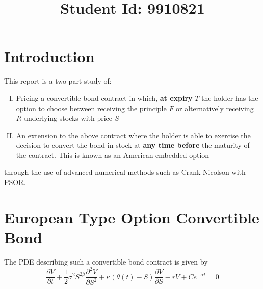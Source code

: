 \documentclass{article}
\begin{document}
\title{Student Id: 9910821}
\date{}

\maketitle
\section*{Introduction}
This report is a two part study of:
\begin{enumerate}[I)]
  \item Pricing a convertible bond contract in  which, \textbf{at expiry} $T$ the  holder  has  the option to  choose  between  receiving the principle $F$ or alternatively receiving $R$ underlying stocks with price $S$
  \item An extension to the above contract where the holder is able to exercise the decision to convert the bond in stock at \textbf{any time before} the maturity of the contract. This is known as an American embedded option
\end{enumerate}
through the use of advanced numerical methods such as Crank-Nicolson with PSOR.

\section{European Type Option Convertible Bond}
The PDE describing such a convertible bond contract is given by
\begin{equation}
  \frac{\partial V}{\partial t} + \frac{1}{2}\sigma^{2}S^{2\beta}\frac{\partial^2 V}{\partial S^2}+\kappa(\theta (t) -S)\frac{\partial V}{\partial S} -rV + Ce^{-\alpha t} =0
  \label{eq:pde_convertible}
\end{equation}
\end{document}
